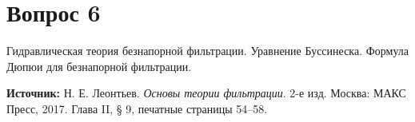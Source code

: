 \documentclass[12pt,a4paper]{article}
\begin{document}
\section*{Вопрос 6}
\noindent Гидравлическая теория безнапорной фильтрации. Уравнение Буссинеска. Формула Дюпюи для безнапорной фильтрации.

\medskip
\noindent\textbf{Источник:} Н. Е. Леонтьев. \textit{Основы теории фильтрации}. 2-е изд. Москва: МАКС Пресс, 2017. Глава II, § 9, печатные страницы 54--58.
\par\bigskip

\end{document}
